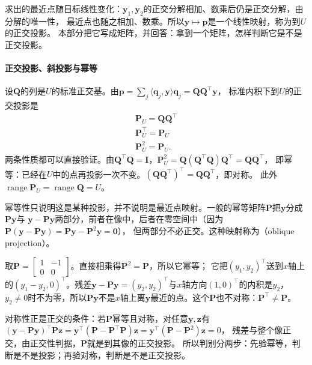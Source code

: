 求出的最近点随目标线性变化：$\bm y_1,\bm y_2$的正交分解相加、数乘后仍是正交分解，由分解的唯一性，
最近点也随之相加、数乘。所以$\bm y\mapsto\bm p$是一个线性映射，称为到$U$的正交投影。
本部分把它写成矩阵，并回答：拿到一个矩阵，怎样判断它是不是正交投影。

\paragraph{正交投影、斜投影与幂等}

设$\bm Q$的列是$U$的标准正交基。由$\bm p=\sum_j\langle\bm q_j,\bm y\rangle\bm q_j=\bm Q\bm Q^\top\bm y$，
标准内积下到$U$的正交投影是
\begin{equation}
\begin{gathered}
\bm P_U=\bm Q\bm Q^\top\\
\bm P_U^\top=\bm P_U\\
\bm P_U^2=\bm P_U.
\end{gathered}
\label{eq:linear-algebra-orthogonal-projector}
\end{equation}
两条性质都可以直接验证。由$\bm Q^\top\bm Q=\bm I$，$\bm P_U^2=\bm Q(\bm Q^\top\bm Q)\bm Q^\top=\bm Q\bm Q^\top$，
即幂等：已经在$U$中的点再投影一次不变。$(\bm Q\bm Q^\top)^\top=\bm Q\bm Q^\top$，即对称。
此外$\operatorname{range}\bm P_U=\operatorname{range}\bm Q=U$。

幂等性只说明这是某种投影，并不说明是最近点映射。一般的幂等矩阵$\bm P$把$\bm y$分成$\bm P\bm y$与
$\bm y-\bm P\bm y$两部分，前者在像中，后者在零空间中（因为$\bm P(\bm y-\bm P\bm y)=\bm P\bm y-\bm P^2\bm y=\bm0$），
但两部分不必正交。这种映射称为（oblique projection）。

\begin{example}[反例：幂等而不对称的投影]
\label{ex:ls-oblique-projection}
取$\bm P=\left[\begin{smallmatrix}1&-1\\0&0\end{smallmatrix}\right]$。直接相乘得$\bm P^2=\bm P$，所以它幂等；
它把$(y_1,y_2)^\top$送到$x$轴上的$(y_1-y_2,0)^\top$。残差$\bm y-\bm P\bm y=(y_2,y_2)^\top$与$x$轴方向$(1,0)^\top$的内积是$y_2$，
$y_2\neq0$时不为零，所以$\bm P\bm y$不是$x$轴上离$\bm y$最近的点。这个$\bm P$也不对称：$\bm P^\top\neq\bm P$。
\end{example}

对称性正是正交的条件：若$\bm P$幂等且对称，对任意$\bm y,\bm z$有
$(\bm y-\bm P\bm y)^\top\bm P\bm z=\bm y^\top(\bm P-\bm P^\top\bm P)\bm z=\bm y^\top(\bm P-\bm P^2)\bm z=0$，
残差与整个像正交，由正交性判据，$\bm P$就是到其像的正交投影。
所以判别分两步：先验幂等，判断是不是投影；再验对称，判断是不是正交投影。

